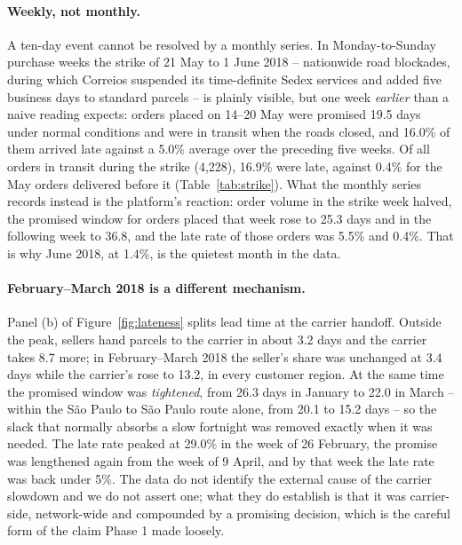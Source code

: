 \paragraph{Weekly, not monthly.} A ten-day event cannot be resolved by a
monthly series. In Monday-to-Sunday purchase weeks the strike of 21 May to
1 June 2018 \citep{bloomberg2018strike} -- nationwide road blockades, during
which Correios suspended its time-definite Sedex services and added five
business days to standard parcels \citep{tecnoblog2018correios} -- is plainly
visible, but one week \emph{earlier} than a naive reading expects: orders placed
on 14--20 May were promised 19.5 days under normal conditions and were in
transit when the roads closed, and 16.0\% of them arrived late against a 5.0\%
average over the preceding five weeks. Of all orders in transit during the
strike (4{,}228), 16.9\% were late, against 0.4\% for the May orders delivered
before it (Table~\ref{tab:strike}). What the monthly series records instead is
the platform's reaction: order volume in the strike week halved, the promised
window for orders placed that week rose to 25.3 days and in the following week
to 36.8, and the late rate of those orders was 5.5\% and 0.4\%. That is why June
2018, at 1.4\%, is the quietest month in the data.

\paragraph{February--March 2018 is a different mechanism.} Panel (b) of
Figure~\ref{fig:lateness} splits lead time at the carrier handoff. Outside the
peak, sellers hand parcels to the carrier in about 3.2 days and the carrier
takes 8.7 more; in February--March 2018 the seller's share was unchanged at
3.4 days while the carrier's rose to 13.2, in every customer region. At the
same time the promised window was \emph{tightened}, from 26.3 days in January
to 22.0 in March -- within the S\~{a}o Paulo to S\~{a}o Paulo route alone, from
20.1 to 15.2 days -- so the slack that normally absorbs a slow fortnight was
removed exactly when it was needed. The late rate peaked at 29.0\% in the week
of 26 February, the promise was lengthened again from the week of 9 April, and
by that week the late rate was back under 5\%. The data do not identify the
external cause of the carrier slowdown and we do not assert one; what they do
establish is that it was carrier-side, network-wide and compounded by a
promising decision, which is the careful form of the claim Phase 1 made
loosely.

